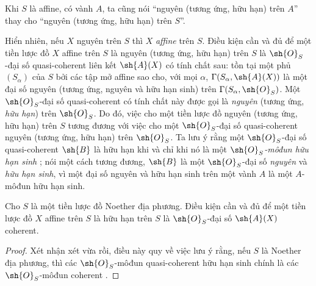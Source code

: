 \documentclass[oneside,10pt]{amsart}
\let\EGAOriginalLabel\label
\renewcommand{\label}[1]{\phantomsection\EGAOriginalLabel{#1}}
\begin{document}
Khi $S$ là affine, có vành $A$, ta cũng nói ``nguyên (tương ứng, hữu hạn) trên $A$'' thay cho ``nguyên (tương ứng, hữu hạn) trên $S$''.

\begin{env}[6.1.2]
\label{II.6.1.2}
Hiển nhiên, nếu $X$ nguyên trên $S$ thì $X$ \emph{affine} trên $S$.
Điều kiện cần và đủ để một tiền lược đồ $X$ affine trên $S$ là nguyên (tương ứng, hữu hạn) trên $S$ là $\sh{O}_S$-đại số quasi-coherent liên kết $\sh{A}(X)$ có tính chất sau: tồn tại một phủ $(S_\alpha)$ của $S$ bởi các tập mở affine sao cho, với mọi $\alpha$, $\Gamma(S_\alpha,\sh{A}(X))$ là một đại số nguyên (tương ứng, nguyên và hữu hạn sinh) trên $\Gamma(S_\alpha,\sh{O}_S)$.
Một $\sh{O}_S$-đại số quasi-coherent có tính chất này được gọi là \emph{nguyên} (tương ứng, \emph{hữu hạn}) trên $\sh{O}_S$.
Do đó, việc cho một tiền lược đồ nguyên (tương ứng, hữu hạn) trên $S$ tương đương  với việc cho một $\sh{O}_S$-đại số quasi-coherent nguyên (tương ứng, hữu hạn) trên $\sh{O}_S$.
Ta lưu ý rằng một $\sh{O}_S$-đại số quasi-coherent $\sh{B}$ là hữu hạn khi và chỉ khi nó là một \emph{$\sh{O}_S$-môđun hữu hạn sinh} ;
nói một cách tương đương, $\sh{B}$ là một $\sh{O}_S$-đại số \emph{nguyên} và \emph{hữu hạn sinh}, vì một đại số nguyên và hữu hạn sinh trên một vành $A$ là một $A$-môđun hữu hạn sinh.
\end{env}

\begin{proposition}[6.1.3]
\label{II.6.1.3}
Cho $S$ là một tiền lược đồ Noether địa phương.
Điều kiện cần và đủ để một tiền lược đồ $X$ affine trên $S$ là hữu hạn trên $S$ là $\sh{O}_S$-đại số $\sh{A}(X)$ coherent.
\end{proposition}
\begin{proof}
Xét nhận xét vừa rồi, điều này quy về việc lưu ý rằng, nếu $S$ là Noether địa phương, thì các $\sh{O}_S$-môđun quasi-coherent hữu hạn sinh chính là các $\sh{O}_S$-môđun coherent .
\end{proof}
\end{document}
